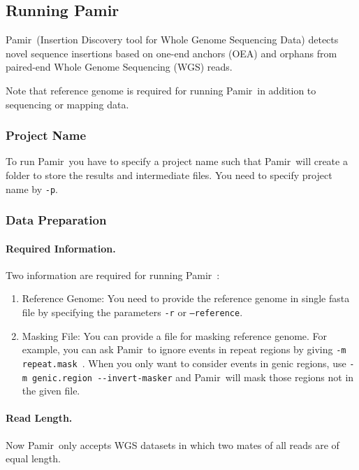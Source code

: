 \documentclass{article}
\newcommand{\toolName}{Pamir~}
\begin{document}
\subsection{Running \toolName}
\toolName (Insertion Discovery tool for Whole Genome Sequencing Data) 
detects novel sequence insertions based on one-end anchors (OEA) and orphans from paired-end Whole Genome Sequencing (WGS) reads.

Note that reference genome is required for running \toolName in addition to sequencing or mapping data.

\subsubsection{Project Name}
To run \toolName you have to specify a project name such that \toolName will create a folder to store the results and intermediate files. You need to specify project name by \texttt{-p}. 


\subsubsection{Data Preparation}
\paragraph{Required Information.} Two information are required for running \toolName:
\begin{enumerate}
\item Reference Genome: You need to provide the reference genome in single fasta file by specifying the parameters \texttt{-r} or \texttt{--reference}.

\item Masking File: You can provide a file for masking reference genome. For example,  you can ask \toolName to ignore events in repeat regions by giving \texttt{-m repeat.mask }. When you only want to consider events in genic regions, use  \texttt{-m genic.region -{}-invert-masker} and \toolName will mask those regions not in the given file.

\end{enumerate}

\paragraph{Read Length.} Now \toolName only accepts WGS datasets in which two mates of all reads are of equal length.
\end{document}
